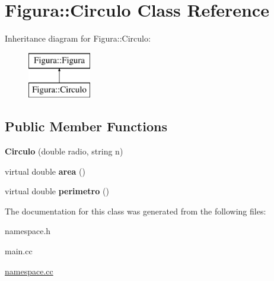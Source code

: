 \hypertarget{classFigura_1_1Circulo}{\section{Figura\-:\-:Circulo Class Reference}
\label{classFigura_1_1Circulo}
}
Inheritance diagram for Figura\-:\-:Circulo\-:\begin{figure}[H]
\begin{center}
\leavevmode
\includegraphics[height=2.000000cm]{classFigura_1_1Circulo}
\end{center}
\end{figure}
\subsection*{Public Member Functions}
\begin{DoxyCompactItemize}
\item 
\hypertarget{classFigura_1_1Circulo_ae53a2338b51e222030eec73a59dc9b8a}{{\bfseries Circulo} (double radio, string n)}\label{classFigura_1_1Circulo_ae53a2338b51e222030eec73a59dc9b8a}

\item 
\hypertarget{classFigura_1_1Circulo_a1e4475d8d704ac3133836ba3653855c0}{virtual double {\bfseries area} ()}\label{classFigura_1_1Circulo_a1e4475d8d704ac3133836ba3653855c0}

\item 
\hypertarget{classFigura_1_1Circulo_a6d1806b05698060c90c92e0679b76f1c}{virtual double {\bfseries perimetro} ()}\label{classFigura_1_1Circulo_a6d1806b05698060c90c92e0679b76f1c}

\end{DoxyCompactItemize}


The documentation for this class was generated from the following files\-:\begin{DoxyCompactItemize}
\item 
namespace.\-h\item 
main.\-cc\item 
\hyperlink{namespace_8cc}{namespace.\-cc}\end{DoxyCompactItemize}
